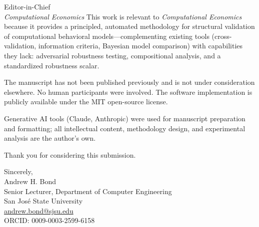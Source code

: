 \documentclass[12pt]{letter}
\begin{document}
\begin{letter}{%
Editor-in-Chief\\
\emph{Computational Economics}}
This work is relevant to \emph{Computational Economics} because it provides a principled, automated methodology for structural validation of computational behavioral models---complementing existing tools (cross-validation, information criteria, Bayesian model comparison) with capabilities they lack: adversarial robustness testing, compositional analysis, and a standardized robustness scalar.

The manuscript has not been published previously and is not under consideration elsewhere.  No human participants were involved.  The software implementation is publicly available under the MIT open-source license.

Generative AI tools (Claude, Anthropic) were used for manuscript preparation and formatting; all intellectual content, methodology design, and experimental analysis are the author's own.

Thank you for considering this submission.

\closing{Sincerely,\\[2em]
Andrew H. Bond\\
Senior Lecturer, Department of Computer Engineering\\
San Jos\'{e} State University\\
\href{mailto:andrew.bond@sjsu.edu}{andrew.bond@sjsu.edu}\\
ORCID: 0009-0003-2599-6158}

\end{letter}
\end{document}
